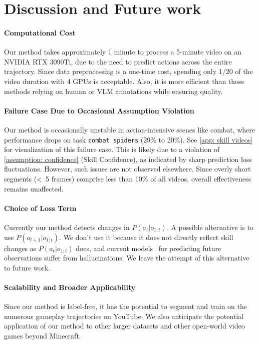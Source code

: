 \section{Discussion and Future work}
\label{sec:discussion}

\paragraph{Computational Cost} 
Our method takes approximately 1 minute to process a 5-minute video on an NVIDIA RTX 3090Ti, due to the need to predict actions across the entire trajectory. Since data preprocessing is a one-time cost, spending only 1/20 of the video duration with 4 GPUs is acceptable. Also, it is more efficient than those methods relying on human or VLM annotations while ensuring quality.

\paragraph{Failure Case Due to Occasional Assumption Violation}
Our method is occasionally unstable in action-intensive scenes like combat, where performance drops on task \texttt{combat spiders} (29\% to 20\%). See \cref{app: skill videos} for visualization of this failure case. This is likely due to a violation of \cref{assumption: confidence} (Skill Confidence), as indicated by sharp prediction loss fluctuations. However, such issues are not observed elsewhere. Since overly short segments (<~5 frames) comprise less than 10\% of all videos, overall effectiveness remains unaffected.

\paragraph{Choice of Loss Term}
Currently our method detects changes in $P(a_t|o_{1:t})$. A possible alternative is to use $P(o_{t+1}|o_{1:t})$. We don't use it because it does not directly reflect skill changes as $P(a_t|o_{1:t})$ does, and current models~\citep{minedreamer} for predicting future observations suffer from hallucinations. We leave the attempt of this alternative to future work.

\paragraph{Scalability and Broader Applicability}
Since our method is label-free, it has the potential to segment and train on the numerous gameplay trajectories on YouTube. We also anticipate the potential application of our method to other larger datasets and other open-world video games beyond Minecraft.

